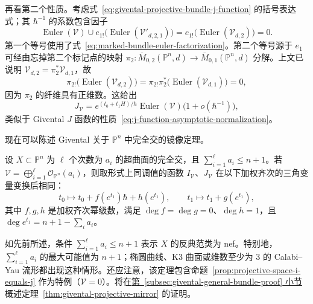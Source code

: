再看第二个性质。考虑式~\eqref{eq:givental-projective-bundle-j-function} 的括号表达式；其 $\hbar^{-1}$ 的系数包含因子
\[
\operatorname{Euler}(\mathcal V)\cup e_{1!}\bigl(\operatorname{Euler}(\mathcal V'_{d,2,1})\bigr)
=e_{1!}\bigl(\operatorname{Euler}(\mathcal V_{d,2})\bigr)=0.
\]
第一个等号使用了式~\eqref{eq:marked-bundle-euler-factorization}。第二个等号源于 $e_1$ 可经由忘掉第二个标记点的映射 $\pi_2:\overline M_{0,2}(\mathbb P^n,d)\to\overline M_{0,1}(\mathbb P^n,d)$ 分解。上文已说明 $\mathcal V_{d,2}=\pi_2^*\mathcal V_{d,1}$，故
\[
\pi_{2!}\bigl(\operatorname{Euler}(\mathcal V_{d,2})\bigr)
=\pi_{2!}\pi_2^*\bigl(\operatorname{Euler}(\mathcal V_{d,1})\bigr)=0,
\]
因为 $\pi_2$ 的纤维具有正维数。这给出
\begin{equation}\label{eq:givental-bundle-j-normalization}
J_{\mathcal V}=e^{(t_0+t_1H)/\hbar}\operatorname{Euler}(\mathcal V)
\bigl(1+o(\hbar^{-1})\bigr),
\end{equation}
类似于 Givental $J$ 函数的性质~\eqref{eq:j-function-asymptotic-normalization}。

现在可以陈述 Givental 关于 $\mathbb P^n$ 中完全交的镜像定理。
\begin{theorem}\label{thm:givental-projective-mirror}
设 $X\subset\mathbb P^n$ 为 $\ell$ 个次数为 $a_i$ 的超曲面的完全交，且 $\sum_{i=1}^{\ell}a_i\le n+1$。若 $\mathcal V=\bigoplus_{i=1}^{\ell}\mathcal O_{\mathbb P^n}(a_i)$，则取形式上同调值的函数 $I_{\mathcal V}$、$J_{\mathcal V}$ 在以下加权齐次的三角变量变换后相同：
\[
t_0\longmapsto t_0+f(e^{t_1})\hbar+h(e^{t_1}),\qquad
 t_1\longmapsto t_1+g(e^{t_1}),
\]
其中 $f,g,h$ 是加权齐次幂级数，满足 $\deg f=\deg g=0$、$\deg h=1$，且 $\deg e^{t_1}=n+1-\sum_i a_i$。
\end{theorem}

如先前所述，条件 $\sum_{i=1}^{\ell}a_i\le n+1$ 表示 $X$ 的反典范类为 nef。特别地，$\sum_{i=1}^{\ell}a_i$ 的最大可能值为 $n+1$；椭圆曲线、K3 曲面或维数至少为 $3$ 的 Calabi--Yau 流形都出现这种情形。还应注意，该定理包含命题~\ref{prop:projective-space-i-equals-j} 作为特例（$\mathcal V=0$）。将在\hyperref[subsec:givental-general-bundle-proof]{第~\ref*{subsec:givental-general-bundle-proof} 小节}概述定理~\ref{thm:givental-projective-mirror} 的证明。

